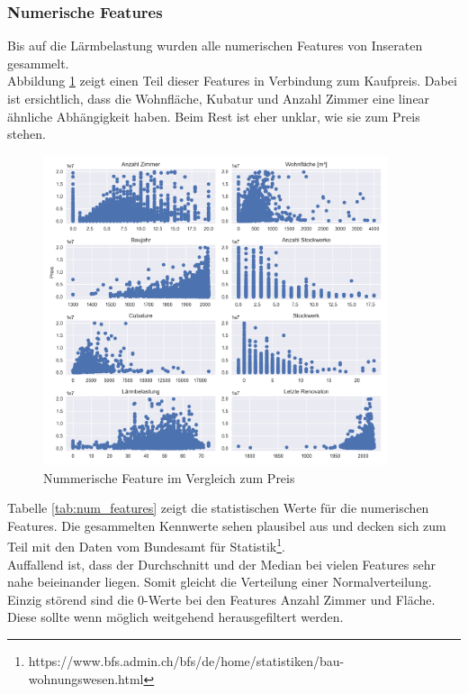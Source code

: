 \subsubsection{Numerische Features}
Bis auf die Lärmbelastung wurden alle numerischen Features von Inseraten gesammelt.\\
Abbildung \ref{fig:num_features} zeigt einen Teil dieser Features in Verbindung zum Kaufpreis. Dabei ist ersichtlich, dass die Wohnfläche, Kubatur und Anzahl Zimmer eine linear ähnliche Abhängigkeit haben. Beim Rest ist eher unklar, wie sie zum Preis stehen.\\[2ex]
%
\begin{figure}[h!]
\centering
\includegraphics[width=0.9\textwidth]{images/Vergleich_zum_preis.png}
\caption[Nummerische Feature im Vergleich zum Preis]{Nummerische Feature im Vergleich zum Preis}%
\label{fig:num_features}
\end{figure}
\newline
%
Tabelle \ref{tab:num_features} zeigt die statistischen Werte für die numerischen Features. Die gesammelten Kennwerte sehen plausibel aus und decken sich zum Teil mit den Daten vom Bundesamt für Statistik\footnote{https://www.bfs.admin.ch/bfs/de/home/statistiken/bau-wohnungswesen.html}.\\
Auffallend ist, dass der Durchschnitt und der Median bei vielen Features sehr nahe beieinander liegen. Somit gleicht die Verteilung einer Normalverteilung.\\
Einzig störend sind die 0-Werte bei den Features Anzahl Zimmer und Fläche. Diese sollte wenn möglich weitgehend herausgefiltert werden.\\[2ex]
